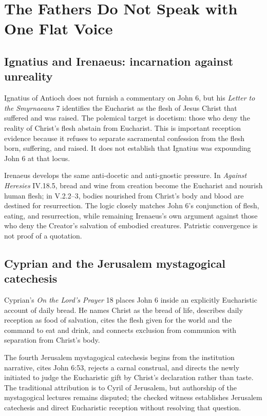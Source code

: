\section{The Fathers Do Not Speak with One Flat Voice}

\subsection{Ignatius and Irenaeus: incarnation against unreality}

Ignatius of Antioch does not furnish a commentary on John 6, but his
\emph{Letter to the Smyrnaeans} 7 identifies the Eucharist as the flesh of
Jesus Christ that suffered and was raised. The polemical target is docetism:
those who deny the reality of Christ's flesh abstain from Eucharist. This is
important reception evidence because it refuses to separate sacramental
confession from the flesh born, suffering, and raised. It does not establish
that Ignatius was expounding John 6 at that locus.

Irenaeus develops the same anti-docetic and anti-gnostic pressure. In
\emph{Against Heresies} IV.18.5, bread and wine from creation become the
Eucharist and nourish human flesh; in V.2.2--3, bodies nourished from Christ's
body and blood are destined for resurrection. The logic closely matches John
6's conjunction of flesh, eating, and resurrection, while remaining Irenaeus's
own argument against those who deny the Creator's salvation of embodied
creatures. Patristic convergence is not proof of a quotation.

\subsection{Cyprian and the Jerusalem mystagogical catechesis}

Cyprian's \emph{On the Lord's Prayer} 18 places John 6 inside an explicitly
Eucharistic account of daily bread. He names Christ as the bread of life,
describes daily reception as food of salvation, cites the flesh given for the
world and the command to eat and drink, and connects exclusion from communion
with separation from Christ's body.

The fourth Jerusalem mystagogical catechesis begins from the institution
narrative, cites John 6:53, rejects a carnal construal, and directs the newly
initiated to judge the Eucharistic gift by Christ's declaration rather than
taste. The traditional attribution is to Cyril of Jerusalem, but authorship of
the mystagogical lectures remains disputed; the checked witness establishes
Jerusalem catechesis and direct Eucharistic reception without resolving that
question.

